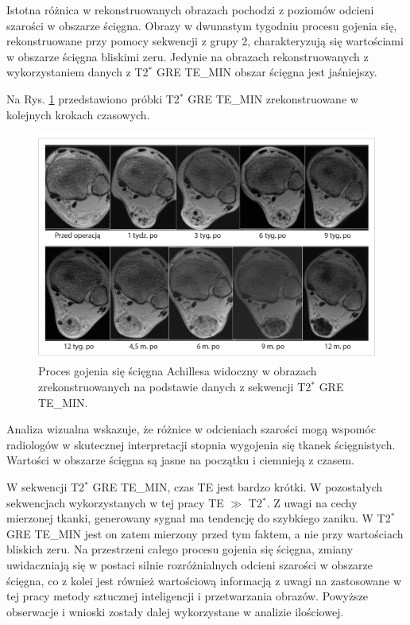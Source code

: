 Istotna różnica w rekonstruowanych obrazach pochodzi z poziomów odcieni szarości w obszarze ścięgna. Obrazy w dwunastym tygodniu procesu gojenia się, rekonstruowane przy pomocy sekwencji z grupy 2, charakteryzują się wartościami w obszarze ścięgna bliskimi zeru. Jedynie na obrazach rekonstruowanych z wykorzystaniem danych z T2$^\ast$ GRE TE\_MIN obszar ścięgna jest jaśniejszy. 

Na Rys. \ref{fig:T2comp} przedstawiono próbki T2$^\ast$ GRE TE\_MIN zrekonstruowane w kolejnych krokach czasowych.
\begin{figure}[h]
	\centering
	\includegraphics[width=1\textwidth]{figures/T2gremin.jpg}
	\caption{Proces gojenia się ścięgna Achillesa widoczny w obrazach zrekonstruowanych na podstawie danych z sekwencji T2$^\ast$ GRE TE\_MIN.}\label{fig:T2comp}
\end{figure}
Analiza wizualna wskazuje, że różnice w odcieniach szarości mogą wspomóc radiologów w skutecznej interpretacji stopnia wygojenia się tkanek ścięgnistych. Wartości w obszarze ścięgna są jasne na początku i ciemnieją z czasem. 

W sekwencji T2$^\ast$ GRE TE\_MIN, czas TE jest bardzo krótki. W pozostałych sekwencjach wykorzystanych w tej pracy TE $\gg$ T2$^\ast$. Z uwagi na cechy mierzonej tkanki, generowany sygnał ma tendencję do szybkiego zaniku. W T2$^\ast$ GRE TE\_MIN jest on zatem mierzony przed tym faktem, a nie przy wartościach bliskich zeru. \linebreak Na przestrzeni całego procesu gojenia się ścięgna, zmiany uwidaczniają się w postaci silnie rozróżnialnych odcieni szarości w obszarze ścięgna, co z kolei jest również wartościową informacją z uwagi na zastosowane w tej pracy metody sztucznej inteligencji i przetwarzania obrazów. Powyższe obserwacje i wnioski zostały dalej wykorzystane w analizie ilościowej.

